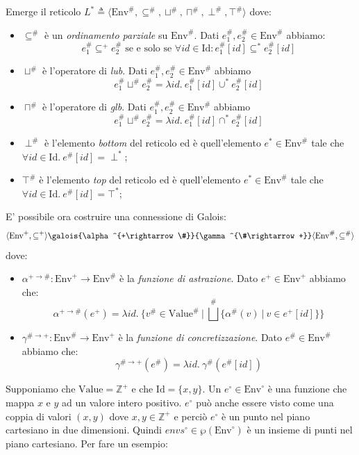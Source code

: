 \documentclass{article}
\newcommand{\envplus}{\textrm{Env}^+}
\newcommand{\envcirc}{\textrm{Env}^{\circ}}
\newcommand{\envsharp}{\textrm{Env}^{\#}}
\newcommand{\posetOf}[2]{\langle #1,\subseteq^{#2},\sqcup^{#2},\sqcap^{#2},\perp^{#2},\top^{#2}\rangle}
\begin{document}
Emerge il reticolo
\(L^{\ast}\triangleq \posetOf{\textrm{Env}^{\#}}{\#}\) dove:
\begin{itemize}
	\item \(\subseteq^{\#}\) è un \textit{ordinamento parziale} su \(\textrm{Env}^{\#}\). Dati \(e^{\#}_1, e^{\#}_2 \in\textrm{Env}^{\#}\) abbiamo: 
	\[ e^{\#}_1\subseteq^{+} e^{\#}_2 \textrm{ se e solo se } \forall id\in\textrm{Id}:e^{\#}_1[id]\subseteq^{\ast} e^{\#}_2[id]\]
	\item \(\sqcup^{\#}\) è l'operatore di \textit{lub}. Dati \(e^{\#}_1, e^{\#}_2 \in\textrm{Env}^{\#}\) abbiamo
	\[ e^{\#}_1\sqcup^{\#} e^{\#}_2 = \lambda id.\  e^{\#}_1[id]\cup^{\ast} e^{\#}_2[id]\]
	\item \(\sqcap^{\#}\) è l'operatore di \textit{glb}. Dati \(e^{\#}_1, e^{\#}_2 \in\textrm{Env}^{\#}\) abbiamo
	\[ e^{\#}_1\sqcup^{\#} e^{\#}_2 = \lambda id.\  e^{\#}_1[id]\cap^{\ast} e^{\#}_2[id]\]
	\item \(\perp^{\#}\) è l'elemento \textit{bottom} del reticolo ed è quell'elemento \(e^{\ast}\in\textrm{Env}^{\#}\) tale che \(\forall id\in\textrm{Id}.\  e^{\#}[id] = \perp^{\ast}\);
	\item \(\top^{\#}\) è l'elemento \textit{top} del reticolo ed è quell'elemento \(e^{\ast}\in\textrm{Env}^{\#}\) tale che \(\forall id\in\textrm{Id}.\  e^{\#}[id] = \top^{\ast}\);
\end{itemize}

E' possibile ora costruire una connessione di Galois:
\[
\langle
	\envplus,
	\subseteq^+
\rangle
\galois
	{\alpha^{+\rightarrow\#}}
	{\gamma^{\#\rightarrow +}}
\langle
	\envsharp,
	\subseteq^{\#}
\rangle
\]
dove: 
\begin{itemize}
\item \(\alpha^{+\rightarrow\#} : \envplus\rightarrow\envsharp\) è la \textit{funzione di astrazione}. Dato \(e^+ \in \envplus\) abbiamo che:
\[\alpha^{+\rightarrow\#}(e^+) = \lambda id.\ \{v^{\#} \in\textrm{Value}^{\#}\ \vert\ \bigsqcup^{\#}\{\alpha^{\#}(v)\ \vert\ v\in e^+[id]\}\}\]
\item \(\gamma^{\#\rightarrow +} : \envsharp\rightarrow\envplus\) è la \textit{funzione di concretizzazione}. Dato \(e^{\#} \in \envsharp\) abbiamo che:
\[\gamma^{\#\rightarrow +}(e^{\#}) = \lambda id.\ \gamma^{\#}(e^{\#}[id])\]
\end{itemize}

Supponiamo che \(\textrm{Value} = \mathbb{Z}^+\) e che \(\textrm{Id}=\{x, y\}\). Un \(e^{\circ}\in\envcirc\) è una funzione che mappa \(x\textrm{ e } y\) ad un valore intero positivo. \(e^{\circ}\) può anche essere visto come una coppia di valori \((x, y)\) dove \(x, y\in\mathbb{Z}^+\) e perciò \(e^{\circ}\) è un punto nel piano cartesiano in due dimensioni.
Quindi \(envs^{\circ}\in\wp(\envcirc)\) è un insieme di punti nel piano cartesiano. Per fare un esempio: 
\end{document}
